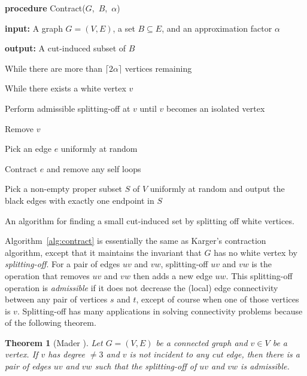 \documentclass[11pt]{article}
\numberwithin{equation}{section}
\newenvironment{alg}{
    \begin{list}{}{
        \setlength{\itemsep}{2pt}
        \setlength{\parsep}{0pt}
        \setlength{\parskip}{0pt}
        \setlength{\topsep}{1pt}
    }
}
{
    \end{list}
}
\newtheorem{theorem}{Theorem}[section]
\newcommand{\newterm}[1]{\textit{#1}}
\newcommand{\AlgorithmName}[1]{\label{alg:#1}}
\newcommand{\Algorithm}[1]{Algorithm~\ref{alg:#1}}
\newcommand{\TheoremName}[1]{\label{thm:#1}}
\begin{document}
\begin{algorithm}
\begin{alg}
\item	\textbf{procedure} Contract($G$,\, $B$,\, $\alpha$)
\item	\textbf{input:} A graph $G=(V,E)$, a set $B \subseteq E$, and an approximation factor $\alpha$
\item	\textbf{output:} A cut-induced subset of $B$
\item	While there are more than $\lceil 2\alpha \rceil$ vertices remaining
    \begin{alg}
    \item	While there exists a white vertex $v$
        \begin{alg}
        \item   Perform admissible splitting-off at $v$ until $v$ becomes an isolated vertex
        \item   Remove $v$
        \end{alg}
    \item	Pick an edge $e$ uniformly at random
    \item	Contract $e$ and remove any self loops
    \end{alg}
\item	Pick a non-empty proper subset $S$ of $V$ uniformly at random
        and output the black edges with exactly one endpoint in $S$
\end{alg}
\caption{An algorithm for finding a small cut-induced set by splitting off white vertices.}
\AlgorithmName{contract}
\end{algorithm}

\Algorithm{contract} is essentially the same as Karger's contraction algorithm,
except that it maintains the invariant that $G$ has no white vertex by \newterm{splitting-off}.
For a pair of edges $uv$ and $vw$, splitting-off $uv$ and $vw$
is the operation that removes $uv$ and $vw$ then adds a new edge $uw$.
This splitting-off operation is \newterm{admissible} 
if it does not decrease the (local) edge connectivity
between any pair of vertices $s$ and $t$, except of course when one of those vertices is $v$.
Splitting-off has many applications in solving connectivity problems
because of the following theorem.

\begin{theorem}[Mader \protect\cite{Mader}]
\TheoremName{mader}
Let $G=(V,E)$ be a connected graph and $v\in V$ be a vertex.
If $v$ has degree $\neq 3$ and $v$ is not incident to any cut edge,
then there is a pair of edges $uv$ and $vw$ such that
the splitting-off of $uv$ and $vw$ is admissible.
\end{theorem}
\end{document}

